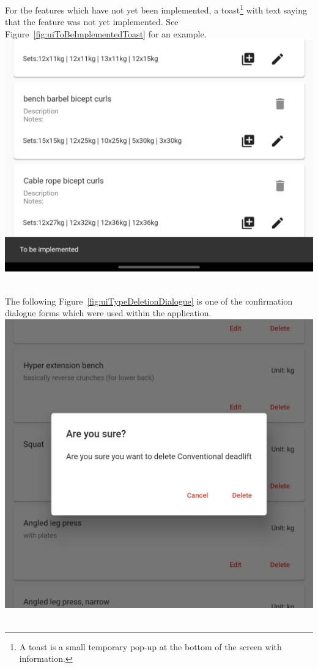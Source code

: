 \documentclass{article}
\begin{document}
\begin{multicols}{2}
For the features which have not yet been implemented, a toast\footnote{A toast is a small temporary pop-up at the bottom of the screen with information.} with text saying that the feature was not yet implemented. See Figure~\ref{fig:uiToBeImplementedToast} for an example.\\

\begingroup
\centering
\includegraphics[width=0.7\linewidth]{./appendix/assets/img/uiScreenShots/toBeImplementedToast.jpg}
~\label{fig:uiToBeImplementedToast}
\endgroup


The following Figure~\ref{fig:uiTypeDeletionDialogue} is one of the confirmation dialogue forms which were used within the application.\\

\begingroup
\centering
\includegraphics[width=0.7\linewidth]{./appendix/assets/img/uiScreenShots/typeDeletionDialogue.jpg}
~\label{fig:uiTypeDeletionDialogue}
\endgroup


\end{multicols}
\end{document}
